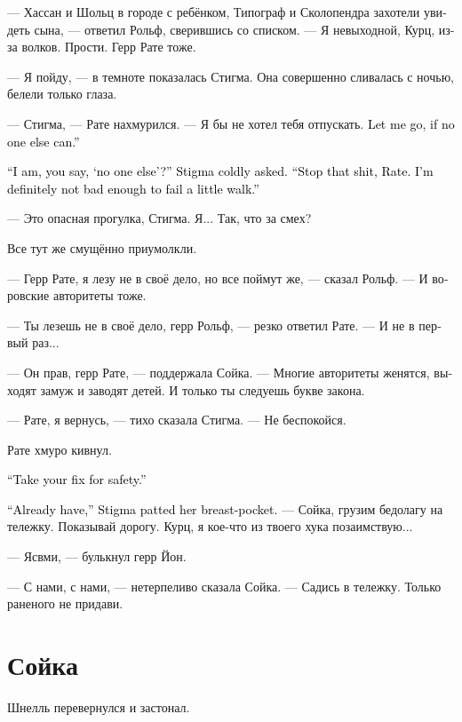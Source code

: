 \documentclass[a4paper,12pt,fleqn]{book}\usepackage{cooltooltips}\usepackage{polyglossia}\setdefaultlanguage[babelshorthands=true]{russian}\setotherlanguage{english}\defaultfontfeatures{Ligatures=TeX,Mapping=tex-text} \usepackage{xcolor}\definecolor{lightgray}{HTML}{bbbbbb}\color{lightgray}\newcommand{\ml}[3]{\textenglish{\textcolor{black}{#3}}}
\begin{document}
--- Хассан и Шольц в городе с ребёнком, Типограф и Сколопендра захотели увидеть сына, --- ответил Рольф, сверившись со списком.
--- Я невыходной, Курц, из-за волков.
Прости.
Герр Рате тоже.

--- Я пойду, --- в темноте показалась Стигма.
Она совершенно сливалась с ночью, белели только глаза.

--- Стигма, --- Рате нахмурился.
--- Я бы не хотел тебя отпускать.
\ml{$0$}
{Давай я уже пойду, если совсем некому.}
{Let me go, if no one else can.''}

\ml{$0$}
{--- Я, по-твоему, <<некому>>? --- осведомилась Стигма.}
{``I am, you say, `no one else'?'' Stigma coldly asked.}
\ml{$0$}
{--- Всё, хватит, Рате.}
{``Stop that shit, Rate.}
\ml{$0$}
{Я недостаточно раскисла, чтобы не выдержать небольшую прогулку.}
{I'm definitely not bad enough to fail a little walk.''}

--- Это опасная прогулка, Стигма.
Я...
Так, что за смех?

Все тут же смущённо приумолкли.

--- Герр Рате, я лезу не в своё дело, но все поймут же, --- сказал Рольф.
--- И воровские авторитеты тоже.

--- Ты лезешь не в своё дело, герр Рольф, --- резко ответил Рате.
--- И не в первый раз...

--- Он прав, герр Рате, --- поддержала Сойка.
--- Многие авторитеты женятся, выходят замуж и заводят детей.
И только ты следуешь букве закона.

--- Рате, я вернусь, --- тихо сказала Стигма.
--- Не беспокойся.

Рате хмуро кивнул.

\ml{$0$}
{--- Дозы возьми на всякий случай.}
{``Take your fix for safety.''}

\ml{$0$}
{--- Уже, --- Стигма похлопала по нагрудному карману.}
{``Already have,'' Stigma patted her breast-pocket.}
--- Сойка, грузим бедолагу на тележку.
Показывай дорогу.
Курц, я кое-что из твоего хука позаимствую...

--- Ясвми, --- булькнул герр Йон.

--- С нами, с нами, --- нетерпеливо сказала Сойка.
--- Садись в тележку.
Только раненого не придави.

\section{Сойка}

Шнелль перевернулся и застонал.
\end{document}
